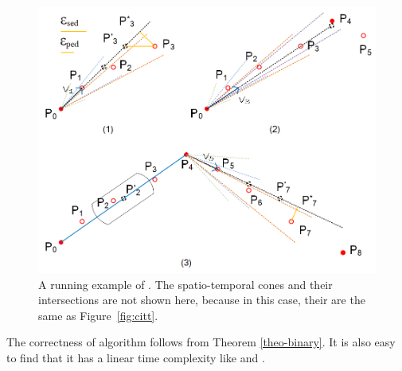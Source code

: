 \begin{figure}[tb!]
	\centering
	\includegraphics[scale=1.0]{figures/Fig-BITT.png}
	\vspace{-2ex}
	\caption{\small A running example of \bitt. The spatio-temporal cones and their intersections are not shown here, because in this case, their are the same as Figure~\ref{fig:citt}. }
	\vspace{-2ex}
	\label{fig:bitt}
\end{figure}

The correctness of algorithm \bitt follows from Theorem \ref{theo-binary}.
It is also easy to find that it has a linear time complexity like \citt and \sitt.


